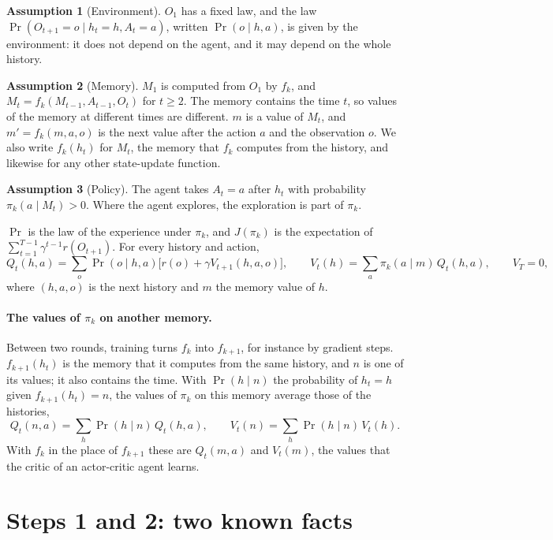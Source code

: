 \documentclass[11pt]{article}
\theoremstyle{definition}
\newtheorem{assumption}{Assumption}
\begin{document}
\begin{assumption}[Environment]\label{as:env}
$O_1$ has a fixed law, and the law $\Pr(O_{t+1}=o\mid h_t=h,A_t=a)$, written $\Pr(o\mid h,a)$, is given by the environment: it does not depend on the agent, and it may depend on the whole history.
\end{assumption}
\begin{assumption}[Memory]\label{as:mem}
$M_1$ is computed from $O_1$ by $f_k$, and $M_t=f_k(M_{t-1},A_{t-1},O_t)$ for $t\ge2$. The memory contains the time $t$, so values of the memory at different times are different. $m$ is a value of $M_t$, and $m'=f_k(m,a,o)$ is the next value after the action $a$ and the observation $o$. We also write $f_k(h_t)$ for $M_t$, the memory that $f_k$ computes from the history, and likewise for any other state-update function.
\end{assumption}
\begin{assumption}[Policy]\label{as:pol}
The agent takes $A_t=a$ after $h_t$ with probability $\pi_k(a\mid M_t)>0$. Where the agent explores, the exploration is part of $\pi_k$.
\end{assumption}

$\Pr$ is the law of the experience under $\pi_k$, and $J(\pi_k)$ is the expectation of $\sum_{t=1}^{T-1}\gamma^{t-1}r(O_{t+1})$. For every history and action,
\begin{equation}\label{eq:bellman}
Q_t(h,a)=\sum_o\Pr(o\mid h,a)\big[r(o)+\gamma V_{t+1}(h,a,o)\big],\qquad V_t(h)=\sum_a\pi_k(a\mid m)\,Q_t(h,a),\qquad V_T=0,
\end{equation}
where $(h,a,o)$ is the next history and $m$ the memory value of $h$.

\paragraph{The values of $\pi_k$ on another memory.} Between two rounds, training turns $f_k$ into $f_{k+1}$, for instance by gradient steps. $f_{k+1}(h_t)$ is the memory that it computes from the same history, and $n$ is one of its values; it also contains the time. With $\Pr(h\mid n)$ the probability of $h_t=h$ given $f_{k+1}(h_t)=n$, the values of $\pi_k$ on this memory average those of the histories,
\[
Q_t(n,a)=\sum_h\Pr(h\mid n)\,Q_t(h,a),\qquad V_t(n)=\sum_h\Pr(h\mid n)\,V_t(h).
\]
With $f_k$ in the place of $f_{k+1}$ these are $Q_t(m,a)$ and $V_t(m)$, the values that the critic of an actor-critic agent learns.

\section{Steps 1 and 2: two known facts}
\end{document}
